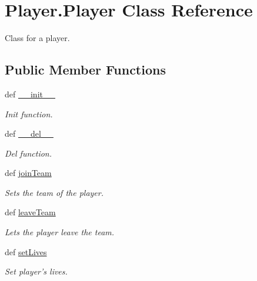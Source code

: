 \hypertarget{class_player_1_1_player}{
\section{Player.Player Class Reference}
\label{class_player_1_1_player}
}


Class for a player.  


\subsection*{Public Member Functions}
\begin{DoxyCompactItemize}
\item 
def \hyperlink{class_player_1_1_player_a24b6d9aadd8f9a4d57ad531a7172209b}{\_\-\_\-init\_\-\_\-}
\begin{DoxyCompactList}\small\item\em Init function. \item\end{DoxyCompactList}\item 
def \hyperlink{class_player_1_1_player_a1cc8f0385a8b8ae30062f1475f08de3b}{\_\-\_\-del\_\-\_\-}
\begin{DoxyCompactList}\small\item\em Del function. \item\end{DoxyCompactList}\item 
def \hyperlink{class_player_1_1_player_aa169627ae36dac4ce2c29dab48184801}{joinTeam}
\begin{DoxyCompactList}\small\item\em Sets the team of the player. \item\end{DoxyCompactList}\item 
def \hyperlink{class_player_1_1_player_a7fb849bfe1c9df24fcc166b16c48f4de}{leaveTeam}
\begin{DoxyCompactList}\small\item\em Lets the player leave the team. \item\end{DoxyCompactList}\item 
def \hyperlink{class_player_1_1_player_af3a510565e600d099419503da9a40f8a}{setLives}
\begin{DoxyCompactList}\small\item\em Set player's lives. \item\end{DoxyCompactList}\item 

\end{DoxyCompactItemize}

